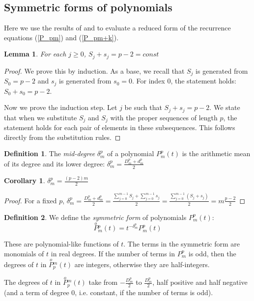 \documentclass[a4paper]{article}
\theoremstyle{plain}
\newtheorem{lemma}{Lemma}[section]
\newtheorem{corollary}{Corollary}[section]
\theoremstyle{definition}
\newtheorem{definition}{Definition}
\newcommand{\SymPol}[2]{\overset{o}{P}{}^{#1}_{#2}}
\begin{document}
\subsection{Symmetric forms of polynomials}
Here we use the results of  and  to evaluate a reduced form of the recurrence equations (\ref{P_pm}) and (\ref{P_pm+k}).
\begin{lemma}
For each $j \ge 0$, $S_j + s_j = p-2 = const$
\end{lemma}
\begin{proof}
We prove this by induction. As a base, we recall that $S_j$ is generated from $S_0 = p-2$ and $s_j$ is generated from $s_0 = 0$. For index $0$, the statement holds: $S_0 + s_0 = p-2$.

Now we prove the induction step. Let $j$ be such that $S_j + s_j = p-2$. We state that when we substitute $S_j$ and $S_j$ with the proper sequences of length $p$, the statement holds for each pair of elements in these subsequences. This follows directly from the substitution rules.
\end{proof}

\begin{definition}
The \emph{mid-degree} $\delta_m^p$ of a polynomial $P_m^p(t)$ is the arithmetic mean of its degree and its lower degree: $\delta_m^p = \frac{D_m^p+d_m^p}{2}$
\end{definition}
\begin{corollary}
$\delta_m^p = \frac{(p-2)m}{2}$
\end{corollary}
\begin{proof}
For a fixed $p$, $\delta_m^p =  \frac{D_m^p+d_m^p}{2} =  \frac{\sum\limits_{j=0}^{m-1}S_j + \sum\limits_{j=0}^{m-1}s_j}{2} =  \frac{\sum\limits_{j=0}^{m-1}(S_j + s_j)}{2} = m \frac{p-2}{2}$
\end{proof}
\begin{definition}
We define the \emph{symmetric form} of polynomials $P_m^p(t)$:
$$ \SymPol{p}{m}(t) = t^{-\delta_m^p}P_m^p(t)$$
\end{definition}

These are polynomial-like functions of $t$. The terms in the symmetric form are monomials of $t$ in real degrees. If the number of terms in $P_m^p$ is odd, then the degrees of $t$ in $\SymPol{m}{p}(t)$ are integers, otherwise they are half-integers.

The degrees of $t$ in $\SymPol{m}{p}(t)$ take from $-\frac{D_m^p}{2} $ to $\frac{D_m^p}{2} $, half positive and half negative (and a term of degree 0, i.e. constant, if the number of terms is odd). 
\end{document}
